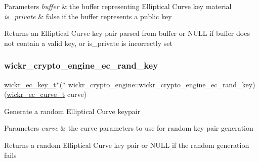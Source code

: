 \begin{DoxyParams}{Parameters}
{\em buffer} & the buffer representing Elliptical Curve key material \\
\hline
{\em is\+\_\+private} & false if the buffer represents a public key \\
\hline
\end{DoxyParams}
\begin{DoxyReturn}{Returns}
an Elliptical Curve key pair parsed from buffer or N\+U\+LL if buffer does not contain a valid key, or is\+\_\+private is incorrectly set 
\end{DoxyReturn}
\mbox{\label{group__wickr__crypto__engine_gad16b229b7d16cf00d3983c277ee3b88b}} 
\subsubsection{\texorpdfstring{wickr\+\_\+crypto\+\_\+engine\+\_\+ec\+\_\+rand\+\_\+key}{wickr\_crypto\_engine\_ec\_rand\_key}}
{\footnotesize\ttfamily \hyperlink{structwickr__ec__key}{wickr\+\_\+ec\+\_\+key\+\_\+t}$\ast$($\ast$ wickr\+\_\+crypto\+\_\+engine\+::wickr\+\_\+crypto\+\_\+engine\+\_\+ec\+\_\+rand\+\_\+key) (\hyperlink{structwickr__ec__curve}{wickr\+\_\+ec\+\_\+curve\+\_\+t} curve)}

Generate a random Elliptical Curve keypair


\begin{DoxyParams}{Parameters}
{\em curve} & the curve parameters to use for random key pair generation \\
\hline
\end{DoxyParams}
\begin{DoxyReturn}{Returns}
a random Elliptical Curve key pair or N\+U\+LL if the random generation fails 
\end{DoxyReturn}
\mbox{\label{group__wickr__crypto__engine_gac5a36d2a53e06a75a2b818e6a5cc96a1}} 
